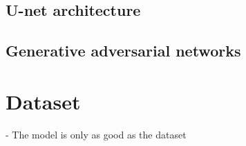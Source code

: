 \subsection{U-net architecture}
\subsection{Generative adversarial networks}

\section{Dataset}
\label{sec:dataset}

- The model is only as good as the dataset
